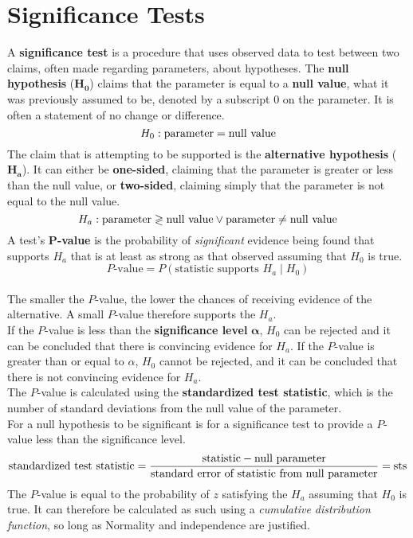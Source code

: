 \documentclass[../AP_Statistics.tex]{subfiles}
\begin{document}
	\chapter{Significance Tests}
		A \textbf{significance test} is a procedure that uses observed data to test between two claims, often made regarding parameters, about hypotheses.
		The \textbf{null hypothesis} ($\pmb{H_0}$) claims that the parameter is equal to a \textbf{null value}, what it was previously assumed to be, denoted by a subscript $0$ on the parameter. It is often a statement of no change or difference.
		\[H_0:\rm{parameter} = \text{null value}\]
		The claim that is attempting to be supported is the \textbf{alternative hypothesis} ($\pmb{H_a}$). It can either be \textbf{one-sided}, claiming that the parameter is greater or less than the null value, or \textbf{two-sided}, claiming simply that the parameter is not equal to the null value.
		\[H_a:\rm{parameter} \gtrless \text{null value} \lor \rm{parameter} \ne \text{null value}\]
		A test's $\pmb{P}$\textbf{-value} is the probability of \emph{significant} evidence being found that supports $H_a$ that is at least as strong as that observed assuming that $H_0$ is true.
		\[P\text{-value} = P(\text{statistic supports } H_a \mid H_0)\] \\
		The smaller the $P$-value, the lower the chances of receiving evidence of the alternative. A small $P$-value therefore supports the $H_a$. \\
		If the $P$-value is less than the \textbf{significance level} $\pmb{\alpha}$, $H_0$ can be rejected and it can be concluded that there is convincing evidence for $H_a$. If the $P$-value is greater than or equal to $\alpha$, $H_0$ cannot be rejected, and it can be concluded that there is not convincing evidence for $H_a$. \\
		The $P$-value is calculated using the \textbf{standardized test statistic}, which is the number of standard deviations from the null value of the parameter. \\
		For a null hypothesis to be significant is for a significance test to provide a $P$-value less than the significance level.
		\[\text{standardized test statistic} = \frac{\text{statistic} - \text{null parameter}}{\text{standard error of statistic from null parameter}} = \mathrm{sts}\]
		The $P$-value is equal to the probability of $z$ satisfying the $H_a$ assuming that $H_0$ is true. It can therefore be calculated as such using a \emph{cumulative distribution function}, so long as Normality and independence are justified.
\end{document}
